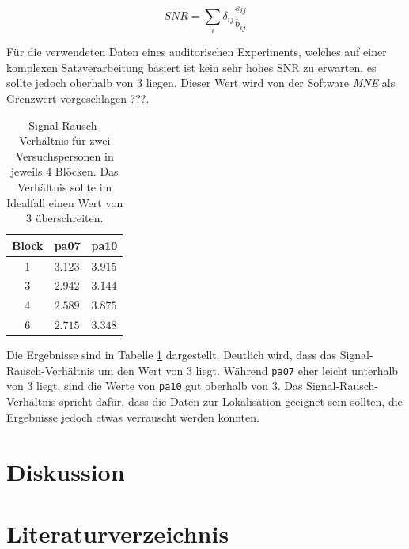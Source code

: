 \documentclass[doc,a4paper,12pt]{apa6}
\begin{document}
\begin{equation}
SNR = \sum_i \delta_{ij} \frac{s_{ij}}{b_{ij}}
\end{equation}

Für die verwendeten Daten eines auditorischen Experiments, welches auf einer komplexen Satzverarbeitung basiert ist kein sehr hohes SNR zu erwarten, es sollte jedoch oberhalb von $3$ liegen. Dieser Wert wird von der Software \emph{MNE} als Grenzwert vorgeschlagen ???.

\begin{table}[t]
\caption{}
\label{tab:snr}
\vspace*{3mm}
\begin{tabularx}{\textwidth}{cll}
Block & pa07 & pa10 \\
\hline
1 & $3.123$ & $3.915$\\
3 & $2.942$ & $3.144$\\
4 & $2.589$ & $3.875$\\
6 & $2.715$ & $3.348$\\
\hline
\end{tabularx}
\vspace*{3mm}
\caption*{Signal-Rausch-Verhältnis für zwei Versuchspersonen in jeweils 4 Blöcken. Das Verhältnis sollte im Idealfall einen Wert von $3$ überschreiten.}
\end{table}

Die Ergebnisse sind in Tabelle \ref{tab:snr} dargestellt. Deutlich wird, dass das Signal-Rausch-Verhältnis um den Wert von $3$ liegt. Während \texttt{pa07} eher leicht unterhalb von $3$ liegt, sind die Werte von \texttt{pa10} gut oberhalb von $3$. Das Signal-Rausch-Verhältnis spricht dafür, dass die Daten zur Lokalisation geeignet sein sollten, die Ergebnisse jedoch etwas verrauscht werden könnten.

\section{Diskussion}
\label{sec:diskussion}

\newpage
\section{Literaturverzeichnis}

\printbibliography[heading=none]

%
\end{document}
